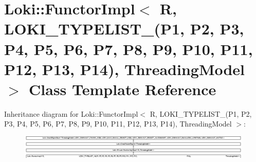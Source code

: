 \hypertarget{classLoki_1_1FunctorImpl_3_01R_00_01_01_01_01_01_01_01_01_01_01_01_01_01_01_01_01_01_01_01_01_01ae97c0dda0b09cac4a281c5ef95111da}{}\section{Loki\+:\+:Functor\+Impl$<$ R, L\+O\+K\+I\+\_\+\+T\+Y\+P\+E\+L\+I\+S\+T\+\_(P1, P2, P3, P4, P5, P6, P7, P8, P9, P10, P11, P12, P13, P14), Threading\+Model $>$ Class Template Reference}
\label{classLoki_1_1FunctorImpl_3_01R_00_01_01_01_01_01_01_01_01_01_01_01_01_01_01_01_01_01_01_01_01_01ae97c0dda0b09cac4a281c5ef95111da}
Inheritance diagram for Loki\+:\+:Functor\+Impl$<$ R, L\+O\+K\+I\+\_\+\+T\+Y\+P\+E\+L\+I\+S\+T\+\_(P1, P2, P3, P4, P5, P6, P7, P8, P9, P10, P11, P12, P13, P14), Threading\+Model $>$\+:\begin{figure}[H]
\begin{center}
\leavevmode
\includegraphics[height=1.114428cm]{classLoki_1_1FunctorImpl_3_01R_00_01_01_01_01_01_01_01_01_01_01_01_01_01_01_01_01_01_01_01_01_01ae97c0dda0b09cac4a281c5ef95111da}
\end{center}
\end{figure}
